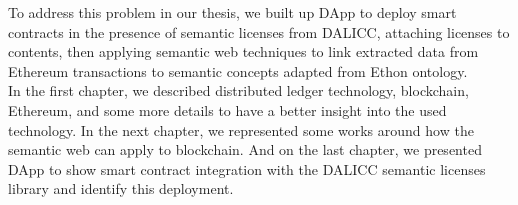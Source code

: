 To address this problem in our thesis, we built up DApp to deploy smart contracts in the presence of semantic licenses from DALICC, attaching licenses to contents, then applying semantic web techniques to link extracted data from Ethereum transactions to semantic concepts adapted from Ethon ontology. \\
In the first chapter, we described distributed ledger technology, blockchain, Ethereum, and some more details to have a better insight into the used technology. In the next chapter, we represented some works around how the semantic web can apply to blockchain. And on the last chapter, we presented DApp to show smart contract integration with the DALICC semantic licenses library and identify this deployment.